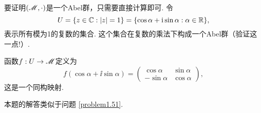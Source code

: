 \begin{solution}
  要证明$(\mathscr M,\cdot)$是一个Abel群，只需要直接计算即可. 令
  \[
    U = \{ z\in\mathbb C:|z| = 1 \} =
    \{ \cos\alpha + \mathrm i\sin\alpha:\alpha\in\mathbb R \},
  \]
  表示所有模为1的复数的集合. 这个集合在复数的乘法下构成一个Abel群（验证这一点!）.

  函数$f:U\to\mathscr M$定义为
  \[
    f(\cos\alpha+\ii\sin\alpha) =
    \begin{pmatrix}
      \cos\alpha & \sin\alpha \\
      -\sin\alpha & \cos\alpha
    \end{pmatrix},
  \]
  这是一个同构映射.
\end{solution}

\begin{solution}
  本题的解答类似于问题 \ref{problem1.51}.
\end{solution}


